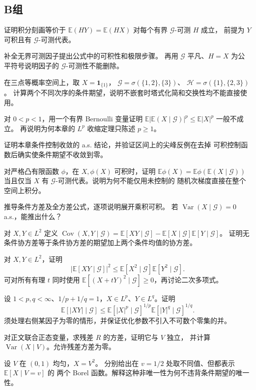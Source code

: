 \subsection*{B组}
\begin{enumerate}[label=\textbf{\thechapter.\arabic*.},resume]
证明积分刻画等价于
$\mathbb E(HY)=\mathbb E(HX)$ 对每个有界 $\mathcal G$-可测 $H$ 成立，
前提为 $Y$ 可积且有 $\mathcal G$-可测代表。

补全无界可测因子提出公式中的可积性和极限步骤。
再用 $\mathcal G$ 平凡、$H=X$ 为公平符号说明因子的
$\mathcal G$-可测性不能删除。

在三点等概率空间上，取 $X=\mathbf1_{\{1\}}$，
$\mathcal G=\sigma(\{1,2\},\{3\})$、
$\mathcal H=\sigma(\{1\},\{2,3\})$。
计算两个不同次序的条件期望，说明不嵌套时塔式化简和交换性均不能直接使用。

对 $0<p<1$，用一个有界 Bernoulli 变量证明
$\mathbb E|\mathbb E(X\mid\mathcal G)|^p\le\mathbb E|X|^p$ 一般不成立。
再说明为何本章的 $L^p$ 收缩定理只陈述 $p\ge1$。

证明本章条件控制收敛的 a.s. 结论，并验证区间上的尖峰反例在去掉
可积控制函数后确实使条件期望不收敛到零。

对严格凸有限函数 $\phi$，在 $X,\phi(X)$ 可积时，证明
$\mathbb E\phi(X)=\mathbb E\phi(\mathbb E(X\mid\mathcal G))$
当且仅当 $X$ 有 $\mathcal G$-可测代表。说明为何不能仅用未控制的
随机次梯度直接在整个空间上积分。

推导条件方差及全方差公式，逐项说明展开乘积可积。
若 $\operatorname{Var}(X\mid\mathcal G)=0$ a.s.，能推出什么？

对 $X,Y\in L^2$ 定义
$\operatorname{Cov}(X,Y\mid\mathcal G)
=\mathbb E[XY\mid\mathcal G]-\mathbb E[X\mid\mathcal G]\mathbb E[Y\mid\mathcal G]$。
证明无条件协方差等于条件协方差的期望加上两个条件均值的协方差。

对 $X,Y\in L^2$，证明
\[
 |\mathbb E[XY\mid\mathcal G]|^2
 \le\mathbb E[X^2\mid\mathcal G]\mathbb E[Y^2\mid\mathcal G].
\]
可对所有有理 $t$ 同时使用
$\mathbb E[(X+tY)^2\mid\mathcal G]\ge0$，再讨论二次多项式。

设 $1<p,q<\infty$、$1/p+1/q=1$，$X\in L^p$、$Y\in L^q$。证明
\[
 \mathbb E[|XY|\mid\mathcal G]
 \le\mathbb E[|X|^p\mid\mathcal G]^{1/p}
       \mathbb E[|Y|^q\mid\mathcal G]^{1/q}.
\]
须处理右侧某因子为零的情形，并保证优化参数不引入不可数个零集的并。

对正文联合正态变量，求残差 $R$ 的方差，证明它与 $V$ 独立，
并计算 $\operatorname{Var}(X\mid V)$。允许残差方差为零。

设 $V$ 在 $(0,1)$ 均匀，$X=V^2$。
分别给出在 $v=1/2$ 处取不同值、但都表示 $\mathbb E[X\mid V=v]$ 的
两个 Borel 函数。解释这种非唯一性为何不违背条件期望的唯一性。
\end{enumerate}

